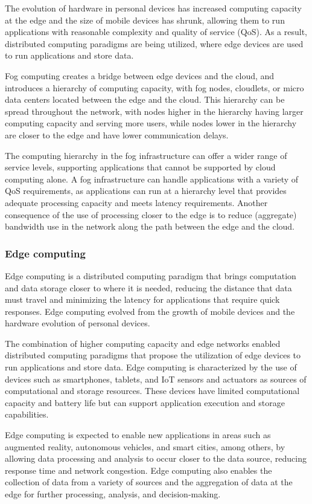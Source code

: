 The evolution of hardware in personal devices has increased computing capacity at the edge and the size of mobile devices has shrunk, allowing them
to run applications with reasonable complexity and quality of service (QoS). As a result, distributed computing paradigms are being utilized, where
edge devices are used to run applications and store data.

Fog computing creates a bridge between edge devices and the cloud, and introduces a hierarchy of computing capacity, with fog nodes, cloudlets, or
micro data centers located between the edge and the cloud. This hierarchy can be spread throughout the network, with nodes higher in the hierarchy
having larger computing capacity and serving more users, while nodes lower in the hierarchy are closer to the edge and have lower communication
delays.

The computing hierarchy in the fog infrastructure can offer a wider range of service levels, supporting applications that cannot be supported by
cloud computing alone. A fog infrastructure can handle applications with a variety of QoS requirements, as applications can run at a hierarchy
level that provides adequate processing capacity and meets latency requirements. Another consequence of the use of processing closer to the edge is
to reduce (aggregate) bandwidth use in the network along the path between the edge and the cloud.

\subsubsection{Edge computing}

Edge computing is a distributed computing paradigm that brings computation and data storage closer to where it is needed, reducing the distance that
data must travel and minimizing the latency for applications that require quick responses. Edge computing evolved from the growth of mobile devices
and the hardware evolution of personal devices.

The combination of higher computing capacity and edge networks enabled distributed computing paradigms that propose the utilization of edge devices
to run applications and store data. Edge computing is characterized by the use of devices such as smartphones, tablets, and IoT sensors and actuators
as sources of computational and storage resources. These devices have limited computational capacity and battery life but can support application
execution and storage capabilities.

Edge computing is expected to enable new applications in areas such as augmented reality, autonomous vehicles, and smart cities, among others, by
allowing data processing and analysis to occur closer to the data source, reducing response time and network congestion. Edge computing also enables
the collection of data from a variety of sources and the aggregation of data at the edge for further processing, analysis, and decision-making.

